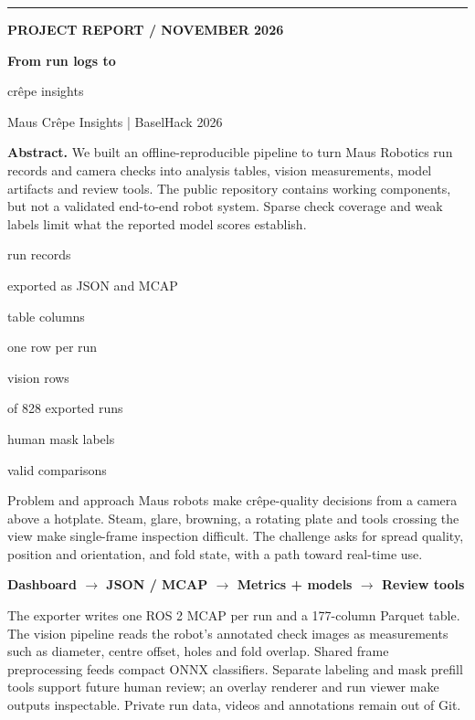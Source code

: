 \documentclass[10pt,a4paper]{article}
\makeatletter
\renewcommand\section{\@startsection{section}{1}{0pt}{9pt}{5pt}%
  {\normalfont\large\bfseries\color{ink}}}
\newcommand{\metric}[3]{%
  \colorbox{tealLight}{\begin{minipage}[t][17mm][c]{0.222\linewidth}
    \centering{\color{teal}\bfseries\LARGE #1}\par\vspace{1pt}
    {\color{muted}\scriptsize #2}\par{\color{muted}\tiny #3}
  \end{minipage}}}
\newcommand{\tagline}[1]{{\color{teal}\small\bfseries\MakeUppercase{#1}}}
\makeatother
\begin{document}
\thispagestyle{fancy}

{\color{teal}\rule{\linewidth}{3pt}}\vspace{6pt}
\tagline{Project report \quad /  November 2026}\par
\vspace{4pt}
{\fontsize{26}{29}\selectfont\bfseries From run logs to\par
cr\^epe insights}\par
\vspace{4pt}
{\large\color{muted}Maus Cr\^epe Insights \quad | \quad BaselHack 2026}\par
\vspace{8pt}
\colorbox{paper}{\parbox{\dimexpr\linewidth-2\fboxsep}{\small
\textbf{Abstract.} We built an offline-reproducible pipeline to turn Maus
Robotics run records and camera checks into analysis tables, vision
measurements, model artifacts and review tools. The public repository contains
working components, but not a validated end-to-end robot system. Sparse check
coverage and weak labels limit what the reported model scores establish.}}
\vspace{8pt}

\noindent\metric{828}{run records}{exported as JSON and MCAP}%
\hfill\metric{177}{table columns}{one row per run}%
\hfill\metric{138}{vision rows}{of 828 exported runs}%
\hfill\metric{62}{human mask labels}{valid comparisons}

\section{Problem and approach}
Maus robots make cr\^epe-quality decisions from a camera above a hotplate.
Steam, glare, browning, a rotating plate and tools crossing the view make
single-frame inspection difficult. The challenge asks for spread quality,
position and orientation, and fold state, with a path toward real-time use.

\vspace{2pt}
\colorbox{paper}{\parbox{\dimexpr\linewidth-2\fboxsep}{\centering\small\bfseries
Dashboard $\rightarrow$ JSON / MCAP $\rightarrow$ Metrics + models
$\rightarrow$ Review tools}}
\vspace{3pt}

The exporter writes one ROS 2 MCAP per run and a 177-column Parquet table.
The vision pipeline reads the robot's annotated check images as measurements
such as diameter, centre offset, holes and fold overlap. Shared frame
preprocessing feeds compact ONNX classifiers. Separate labeling and mask
prefill tools support future human review; an overlay renderer and run viewer
make outputs inspectable. Private run data, videos and annotations remain out
of Git.
\end{document}
